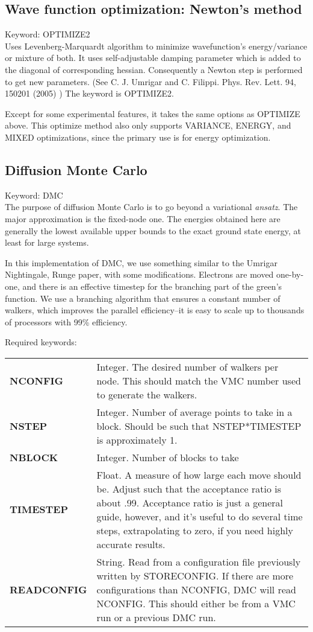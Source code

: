 \documentclass[12pt]{article}
\begin{document}
\subsection{Wave function optimization: Newton's method}
Keyword: OPTIMIZE2 \\

Uses Levenberg-Marquardt algorithm to minimize wavefunction's
energy/variance or mixture of both. It uses self-adjustable 
damping parameter which is added to the diagonal of corresponding hessian.
Consequently a Newton step is performed to get new parameters.    
(See C. J. Umrigar and C. Filippi.  Phys. Rev. Lett. 94, 150201 (2005) )
The keyword is OPTIMIZE2.

Except for some experimental features, it takes the same options as OPTIMIZE 
above.  This optimize method also only supports VARIANCE, ENERGY, and 
MIXED optimizations, since the primary use is for energy optimization.

\subsection{Diffusion Monte Carlo}
Keyword: DMC \\

The purpose of diffusion Monte Carlo is to go beyond a variational 
\emph{ansatz}.  The major approximation is the fixed-node one.  
The energies obtained here are generally the lowest 
available upper bounds to the exact ground state energy, at least for 
large systems.  

In this implementation of DMC, we use something similar to the Umrigar
Nightingale, Runge paper, with some modifications.  Electrons are moved 
one-by-one, and there is an effective timestep for the branching part of 
the green's function.  We use a branching algorithm 
that ensures a constant number of walkers, which improves the 
parallel efficiency--it is easy to scale up to thousands of processors
with 99\% efficiency.

Required keywords: \\
\begin{tabular}{lp{12cm}}
{\bf NCONFIG} &  Integer. The desired number of walkers
per node.  This should match the VMC number used to generate the walkers. \\
{\bf NSTEP} & Integer.   Number of average points to take in a block.
 Should be such that NSTEP*TIMESTEP is approximately 1. \\
{\bf NBLOCK} & Integer.  Number of blocks to take\\
{\bf TIMESTEP} & Float.  A measure of how large each move 
should be.  Adjust such that the acceptance ratio is about .99. Acceptance ratio
is just a general guide, however, and it's useful to do several time steps, extrapolating
to zero, if you need highly accurate results.\\
{\bf  READCONFIG } & String.  Read from a configuration file
previously written by STORECONFIG.  If there are more  configurations 
than NCONFIG, DMC will read NCONFIG.  This should either be from a VMC 
run or a previous DMC run. \\
\end{tabular}
\end{document}
